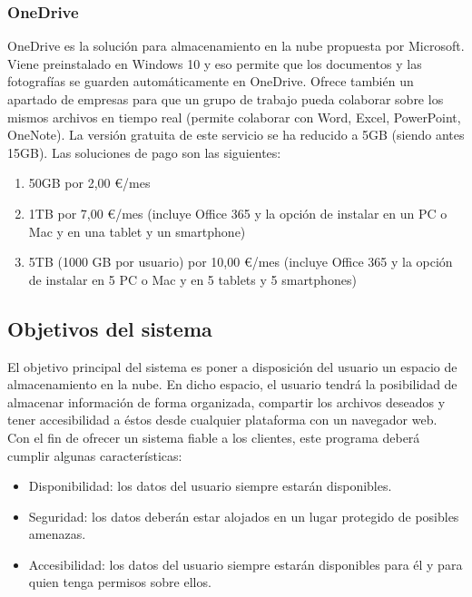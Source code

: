 \hfill\begin{minipage}{\dimexpr\textwidth-1cm}
\subsubsection{OneDrive \cite{cita_onedrive}}
OneDrive es la solución para almacenamiento en la nube propuesta por Microsoft. Viene preinstalado en Windows 10 y eso permite que los documentos y las fotografías se guarden automáticamente en OneDrive. Ofrece también un apartado de empresas para que un grupo de trabajo pueda colaborar sobre los mismos archivos en tiempo real (permite colaborar con Word, Excel, PowerPoint, OneNote).
La versión gratuita de este servicio se ha reducido a 5GB (siendo antes 15GB). Las soluciones de pago son las siguientes:
\begin{enumerate}[label=(\alph*)]
	\item 50GB por 2,00 \euro/mes
	\item 1TB por 7,00 \euro/mes (incluye Office 365 y la opción de instalar en un PC o Mac y en una tablet y un smartphone)
	\item 5TB (1000 GB por usuario) por 10,00 \euro/mes (incluye Office 365 y la opción de instalar en 5 PC o Mac y en 5 tablets y 5 smartphones)
\end{enumerate}
\end{minipage}

\subsection{Objetivos del sistema}
El objetivo principal del sistema es poner a disposición del usuario un espacio de almacenamiento en la nube. En dicho espacio, el usuario tendrá la posibilidad de almacenar información de forma organizada, compartir los archivos deseados y tener accesibilidad a éstos desde cualquier plataforma con un navegador web. \\

Con el fin de ofrecer un sistema fiable a los clientes, este programa deberá cumplir algunas características:
\begin{itemize}
	\item Disponibilidad: los datos del usuario siempre estarán disponibles.
	\item Seguridad: los datos deberán estar alojados en un lugar protegido de posibles amenazas.
	\item Accesibilidad: los datos del usuario siempre estarán disponibles para él y para quien tenga permisos sobre ellos.
\end{itemize}


